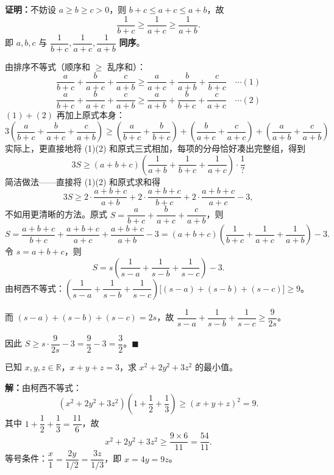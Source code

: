 \documentclass[12pt, a4paper]{ctexart}
\begin{document}
\textbf{证明：}不妨设 $a \geqslant b \geqslant c > 0$，则 $b + c \leqslant a + c \leqslant a + b$，故
\[
  \frac{1}{b+c} \geqslant \frac{1}{a+c} \geqslant \frac{1}{a+b}.
\]
即 $a, b, c$ 与 $\dfrac{1}{b+c}, \dfrac{1}{a+c}, \dfrac{1}{a+b}$ \textbf{同序}。

由排序不等式（顺序和 $\geqslant$ 乱序和）：
\[
  \frac{a}{b+c} + \frac{b}{a+c} + \frac{c}{a+b} \geqslant \frac{a}{a+c} + \frac{b}{a+b} + \frac{c}{b+c} \quad \cdots (1)
\]
\[
  \frac{a}{b+c} + \frac{b}{a+c} + \frac{c}{a+b} \geqslant \frac{a}{a+b} + \frac{b}{b+c} + \frac{c}{a+c} \quad \cdots (2)
\]
$(1) + (2)$ 再加上原式本身：
\[
  3\!\left(\frac{a}{b+c} + \frac{b}{a+c} + \frac{c}{a+b}\right) \geqslant \left(\frac{a}{b+c} + \frac{b}{b+c}\right) + \left(\frac{b}{a+c} + \frac{c}{a+c}\right) + \left(\frac{a}{a+b} + \frac{c}{a+b}\right)
\]
实际上，更直接地将 (1)(2) 和原式三式相加，每项的分母恰好凑出完整组，得到
\[
  3S \geqslant (a+b+c)\!\left(\frac{1}{a+b} + \frac{1}{b+c} + \frac{1}{a+c}\right) \cdot \frac{1}{?}
\]
简洁做法——直接将 (1)(2) 和原式求和得
\[
  3S \geqslant 2 \cdot \frac{a+b+c}{a+b} + 2\cdot \frac{a+b+c}{b+c} + 2\cdot \frac{a+b+c}{a+c} - 3,
\]
不如用更清晰的方法。原式 $S = \dfrac{a}{b+c} + \dfrac{b}{a+c} + \dfrac{c}{a+b}$，则
\[
  S = \frac{a+b+c}{b+c} + \frac{a+b+c}{a+c} + \frac{a+b+c}{a+b} - 3 = (a+b+c)\!\left(\frac{1}{b+c} + \frac{1}{a+c} + \frac{1}{a+b}\right) - 3.
\]
令 $s = a + b + c$，则
\[
  S = s\!\left(\frac{1}{s-a} + \frac{1}{s-b} + \frac{1}{s-c}\right) - 3.
\]
由柯西不等式：$\left(\dfrac{1}{s-a} + \dfrac{1}{s-b} + \dfrac{1}{s-c}\right)\!\big[(s-a) + (s-b) + (s-c)\big] \geqslant 9$。

而 $(s-a) + (s-b) + (s-c) = 2s$，故 $\dfrac{1}{s-a} + \dfrac{1}{s-b} + \dfrac{1}{s-c} \geqslant \dfrac{9}{2s}$。

因此 $S \geqslant s \cdot \dfrac{9}{2s} - 3 = \dfrac{9}{2} - 3 = \dfrac{3}{2}$。\hfill $\blacksquare$

\begin{examplebox}[【例题7】柯西不等式求多元函数最值]
已知 $x, y, z \in \mathbb{R}$，$x + y + z = 3$，求 $x^2 + 2y^2 + 3z^2$ 的最小值。
\end{examplebox}

\textbf{解：}由柯西不等式：
\[
  (x^2 + 2y^2 + 3z^2)\!\left(1 + \frac{1}{2} + \frac{1}{3}\right) \geqslant (x + y + z)^2 = 9.
\]
其中 $1 + \dfrac{1}{2} + \dfrac{1}{3} = \dfrac{11}{6}$，故
\[
  x^2 + 2y^2 + 3z^2 \geqslant \frac{9 \times 6}{11} = \frac{54}{11}.
\]
等号条件：$\dfrac{x}{1} = \dfrac{2y}{1/2} = \dfrac{3z}{1/3}$，即 $x = 4y = 9z$。
\end{document}
